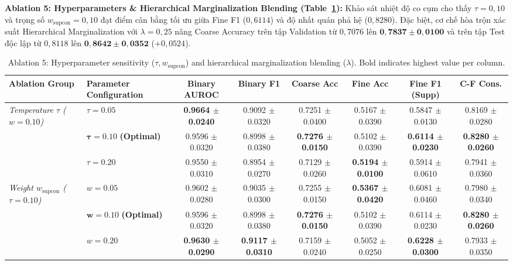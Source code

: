 \documentclass[runningheads]{llncs}
\begin{document}
\noindent \textbf{Ablation 5: Hyperparameters \& Hierarchical Marginalization Blending (Table~\ref{tab:ablation_hyperparameters_blending}):} 
Khảo sát nhiệt độ co cụm cho thấy $\tau = 0{,}10$ và trọng số $w_{\text{supcon}} = 0{,}10$ đạt điểm cân bằng tối ưu giữa Fine F1 ($0{,}6114$) và độ nhất quán phả hệ ($0{,}8280$). Đặc biệt, cơ chế hòa trộn xác suất Hierarchical Marginalization với $\lambda = 0{,}25$ nâng Coarse Accuracy trên tập Validation từ $0{,}7076$ lên $\mathbf{0{,}7837 \pm 0{,}0100}$ và trên tập Test độc lập từ $0{,}8118$ lên $\mathbf{0{,}8642 \pm 0{,}0352}$ ($+0{,}0524$).

\begin{table}[t]
\centering
\caption{Ablation 5: Hyperparameter sensitivity ($\tau, w_{\text{supcon}}$) and hierarchical marginalization blending ($\lambda$). Bold indicates highest value per column.}
\label{tab:ablation_hyperparameters_blending}
\begin{adjustbox}{max width=\textwidth}
\begin{tabular}{llcccccc}
\toprule
\textbf{Ablation Group} & \textbf{Parameter Configuration} & \textbf{Binary AUROC} & \textbf{Binary F1} & \textbf{Coarse Acc} & \textbf{Fine Acc} & \textbf{Fine F1 (Supp)} & \textbf{C-F Cons.} \\
\midrule
\textit{Temperature $\tau$ ($w=0.10$)} & $\tau = 0.05$ & \textbf{0.9664 $\pm$ 0.0240} & 0.9092 $\pm$ 0.0320 & 0.7251 $\pm$ 0.0400 & 0.5167 $\pm$ 0.0390 & 0.5847 $\pm$ 0.0130 & 0.8169 $\pm$ 0.0280 \\
& $\mathbf{\tau = 0.10}$ \textbf{(Optimal)} & 0.9596 $\pm$ 0.0320 & 0.8998 $\pm$ 0.0380 & \textbf{0.7276 $\pm$ 0.0150} & 0.5102 $\pm$ 0.0390 & \textbf{0.6114 $\pm$ 0.0230} & \textbf{0.8280 $\pm$ 0.0260} \\
& $\tau = 0.20$ & 0.9550 $\pm$ 0.0310 & 0.8954 $\pm$ 0.0270 & 0.7129 $\pm$ 0.0260 & \textbf{0.5194 $\pm$ 0.0100} & 0.5914 $\pm$ 0.0610 & 0.7941 $\pm$ 0.0360 \\
\midrule
\textit{Weight $w_{\text{supcon}}$ ($\tau=0.10$)} & $w = 0.05$ & 0.9602 $\pm$ 0.0280 & 0.9035 $\pm$ 0.0300 & 0.7255 $\pm$ 0.0150 & \textbf{0.5367 $\pm$ 0.0420} & 0.6081 $\pm$ 0.0460 & 0.7980 $\pm$ 0.0340 \\
& $\mathbf{w = 0.10}$ \textbf{(Optimal)} & 0.9596 $\pm$ 0.0320 & 0.8998 $\pm$ 0.0380 & \textbf{0.7276 $\pm$ 0.0150} & 0.5102 $\pm$ 0.0390 & 0.6114 $\pm$ 0.0230 & \textbf{0.8280 $\pm$ 0.0260} \\
& $w = 0.20$ & \textbf{0.9630 $\pm$ 0.0290} & \textbf{0.9117 $\pm$ 0.0310} & 0.7159 $\pm$ 0.0240 & 0.5052 $\pm$ 0.0250 & \textbf{0.6228 $\pm$ 0.0300} & 0.7933 $\pm$ 0.0350 \\

\end{tabular}
\end{adjustbox}
\end{table}
\end{document}
